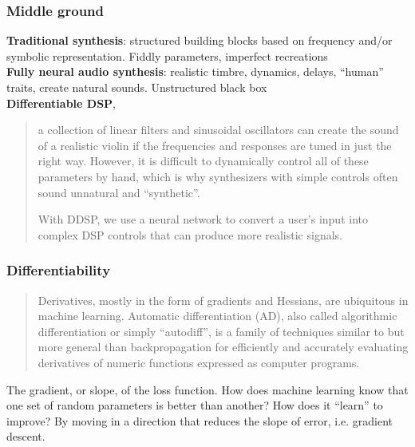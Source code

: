 \documentclass{beamer}
\begin{document}
\begin{frame}
\frametitle{Middle ground}
	\textbf{\textcolor{burgundy}{Traditional synthesis}}: structured building blocks based on frequency and/or symbolic representation. Fiddly parameters, imperfect recreations\\
	\textbf{\textcolor{burgundy}{Fully neural audio synthesis}}: realistic timbre, dynamics, delays, ``human'' traits, create natural sounds. Unstructured black box\\
	\textbf{\textcolor{ao(english)}{Differentiable DSP}}, 
	\begin{quote}
		a collection of linear filters and sinusoidal oscillators can create the sound of a realistic violin if the frequencies and responses are tuned in just the right way. However, it is difficult to dynamically control all of these parameters by hand, which is why synthesizers with simple controls often sound unnatural and ``synthetic''.

		With DDSP, we use a neural network to convert a user's input into complex DSP controls that can produce more realistic signals.
	\end{quote}
\end{frame}


\begin{frame}
	\frametitle{Differentiability}
	\begin{quote}
		Derivatives, mostly in the form of gradients and Hessians, are ubiquitous in machine learning. Automatic differentiation (AD), also called algorithmic differentiation or simply ``autodiff'', is a family of techniques similar to but more general than backpropagation for efficiently and accurately evaluating derivatives of numeric functions expressed as computer programs.
	\end{quote}
	The gradient, or slope, of the loss function. How does machine learning know that one set of random parameters is better than another? How does it ``learn'' to improve? By moving in a direction that reduces the slope of error, i.e. gradient descent.
\end{frame}
\end{document}
